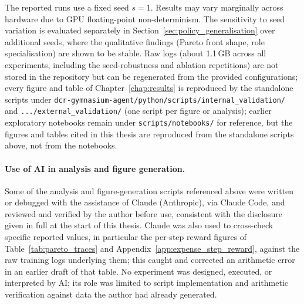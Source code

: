 The reported runs use a fixed seed $s = 1$. Results may vary marginally
across hardware due to GPU floating-point non-determinism. The
sensitivity to seed variation is evaluated separately in
Section~\ref{sec:policy_generalisation} over additional seeds, where the
qualitative findings (Pareto front shape, role specialisation) are shown
to be stable. Raw logs (about 1.1\,GB across all experiments,
including the seed-robustness and ablation repetitions) are not
stored in the repository but can be regenerated from the provided
configurations; every figure and table of Chapter~\ref{chap:results}
is reproduced by the standalone scripts under
\texttt{dcr-gymnasium-agent/python/scripts/internal\_validation/} and
\texttt{.../external\_validation/} (one script per figure or
analysis); earlier exploratory notebooks remain under
\texttt{scripts/notebooks/} for reference, but the figures and tables
cited in this thesis are reproduced from the standalone scripts above,
not from the notebooks.

\paragraph{Use of AI in analysis and figure generation.} Some of the
analysis and figure-generation scripts referenced above were written
or debugged with the assistance of Claude (Anthropic), via Claude
Code, and reviewed and verified by the author before use, consistent
with the disclosure given in full at the start of this thesis. Claude
was also used to cross-check specific reported values, in particular
the per-step reward figures of Table~\ref{tab:pareto_traces} and
Appendix~\ref{app:expense_step_reward}, against the raw training logs
underlying them; this caught and corrected an arithmetic error in an
earlier draft of that table. No experiment was designed, executed, or
interpreted by AI; its role was limited to script implementation and
arithmetic verification against data the author had already
generated.
